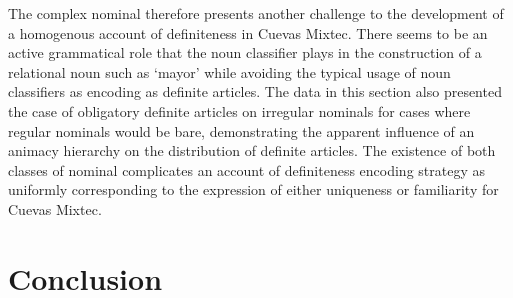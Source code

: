 \documentclass[output=paper,modfonts,nonflat]{langsci/langscibook}
\begin{document}
The complex nominal therefore presents another challenge to the development of a homogenous account of definiteness in Cuevas Mixtec.  There seems to be an active grammatical role that the noun classifier plays in the construction of a relational noun such as `mayor' while avoiding the typical usage of noun classifiers as encoding  as definite articles.
The data in this section also presented the case of obligatory definite articles on irregular nominals for cases where regular nominals would be bare, demonstrating the apparent influence of an animacy hierarchy on the distribution of definite articles.  The existence of both classes of nominal complicates an account of definiteness encoding strategy as uniformly corresponding to the expression of either uniqueness or familiarity for Cuevas Mixtec.

\section{Conclusion} \label{sec:cisneros:6}
\end{document}

